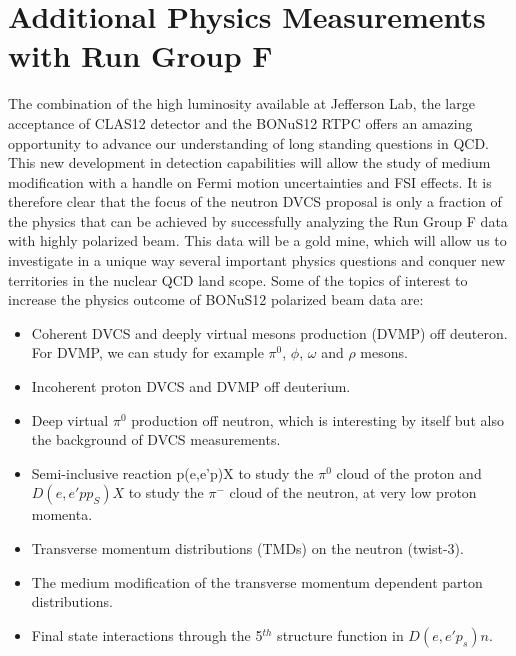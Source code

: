  \chapter{Additional Physics Measurements with Run Group F}
 \label{chap:additional}

The combination of the high luminosity available at Jefferson Lab, the large 
acceptance of CLAS12 detector and the BONuS12 RTPC offers an amazing 
opportunity to advance our understanding of long standing questions in QCD.  
This new development in detection capabilities will allow the study of medium 
modification with a handle on Fermi motion uncertainties and FSI effects. It is 
therefore clear that the focus of the neutron DVCS proposal is only a fraction 
of the physics that can be achieved by successfully analyzing the Run Group F 
data with highly polarized beam. This data will be a gold mine, which will 
allow us to investigate in a unique way several important physics questions and 
conquer new territories in the nuclear QCD land scope. Some of the topics of 
interest to increase the physics outcome of BONuS12 polarized beam data are:

\begin{itemize}
\item Coherent DVCS and deeply virtual mesons production (DVMP) off deuteron.  
   For DVMP, we can study for example $\pi^0$, $\phi$, $\omega$ and $\rho$ 
      mesons.

\item Incoherent proton DVCS and DVMP off deuterium.

\item Deep virtual $\pi^0$ production off neutron, which is interesting by 
   itself but also the background of DVCS measurements.
\item Semi-inclusive reaction p(e,e'p)X to study the $\pi^0$ cloud of the 
   proton and $D(e, e' pp_S)X$ to study the $\pi^-$ cloud of the neutron, at 
      very low proton momenta.
   \item Transverse momentum distributions (TMDs) on the neutron (twist-3).
\item The medium modification of the transverse momentum dependent parton 
   distributions.
\item Final state interactions through the 5$^{th}$ structure function in 
$D(e,e'p_s)n$.  \end{itemize}

